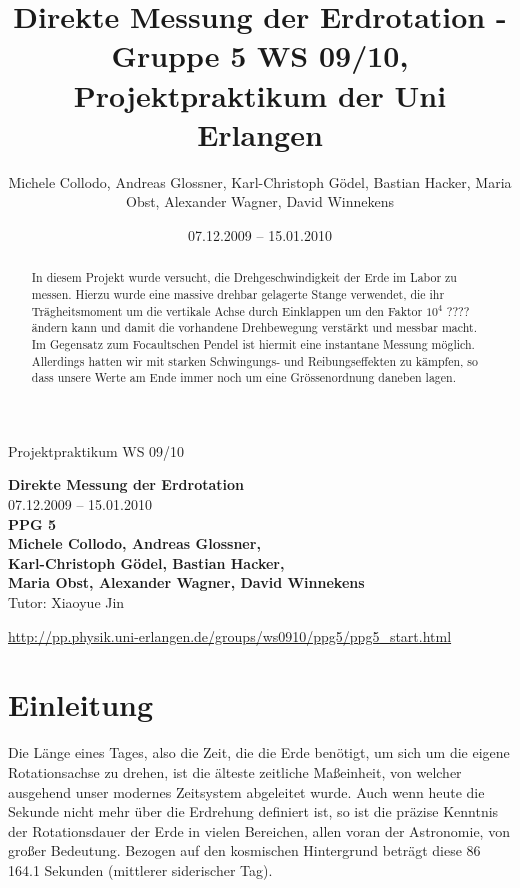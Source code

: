 \documentclass[11pt]{scrartcl}
\title{Direkte Messung der Erdrotation - Gruppe 5 WS 09/10, Projektpraktikum der Uni Erlangen}
\date{07.12.2009 -- 15.01.2010}
\author{Michele Collodo, Andreas Glossner, Karl-Christoph G\"odel, Bastian Hacker, Maria Obst, Alexander Wagner, David Winnekens}
\begin{document}
\sloppy %
\thispagestyle{empty}
\large{Projektpraktikum WS 09/10}
\hfill
{}
\\[8\baselineskip]
\begin{center}
{\fontsize{36}{54}\textbf{Direkte Messung der Erdrotation}}
\\[2\baselineskip]
{\Large 07.12.2009 -- 15.01.2010}
\\[7\baselineskip]
{\huge\textbf{PPG 5}}
\\[0.5\baselineskip]
{\large\textbf{
Michele Collodo,
Andreas Glossner,\\
Karl-Christoph G\"odel,
Bastian Hacker,\\
Maria Obst,
Alexander Wagner,
David Winnekens}\\
Tutor: Xiaoyue Jin}
\vfill



\small{\url{http://pp.physik.uni-erlangen.de/groups/ws0910/ppg5/ppg5\_start.html}}
\end{center}
\newpage



\tableofcontents
\vfill



\begin{abstract}
In diesem Projekt wurde versucht, die Drehgeschwindigkeit der Erde im Labor zu messen.
Hierzu wurde eine massive drehbar gelagerte Stange verwendet, die ihr Trägheitsmoment um die vertikale Achse durch Einklappen um den Faktor $10^4$ ???? ändern kann und damit die vorhandene Drehbewegung verstärkt und messbar macht.
Im Gegensatz zum Focaultschen Pendel ist hiermit eine instantane Messung möglich.
Allerdings hatten wir mit starken Schwingungs- und Reibungseffekten zu kämpfen, so dass unsere Werte am Ende immer noch um eine Gr\"ossenordnung daneben lagen.
\end{abstract}
\newpage

\section{Einleitung} %
Die Länge eines Tages, also die Zeit, die die Erde benötigt, um sich um die eigene Rotationsachse zu drehen, ist die älteste zeitliche Maßeinheit, von welcher ausgehend unser modernes Zeitsystem abgeleitet wurde. Auch wenn heute die Sekunde nicht mehr über die Erdrehung definiert ist, so ist die präzise Kenntnis der Rotationsdauer der Erde in vielen Bereichen, allen voran der Astronomie, von großer Bedeutung. Bezogen auf den kosmischen Hintergrund beträgt diese 86\,164.1 Sekunden (mittlerer siderischer Tag).
\end{document}
